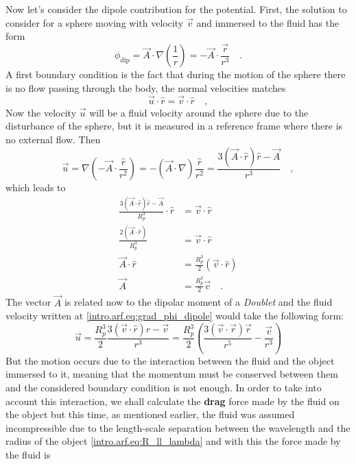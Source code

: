 Now let's consider the dipole contribution for the potential. First, the solution to consider for a sphere moving with velocity $\vec v$ and immersed to the fluid has the form
\begin{equation}\label{intro.arf.eq:dipolar_phi}
    \phi_{\text{dip}} = \vec A \cdot \nabla\left(\frac{1}{r}\right) = -\vec A\cdot\frac{\vec r}{r^3}\quad.
\end{equation}
A first boundary condition is the fact that during the motion of the sphere there is no flow passing  through the body, the normal velocities matches
\begin{equation}\label{intro.arf.eq:vn_un}
    \vec u\cdot\hat r = \vec v\cdot \hat r\quad,
\end{equation}
Now the velocity $\vec u$ will be a fluid velocity around the sphere due to the disturbance of the sphere, but it is measured in a reference frame where there is no external flow. Then
\begin{equation}\label{intro.arf.eq:grad_phi_dipole}
    \vec u = \nabla\left(-\vec A \cdot \frac{\hat r}{r^2}\right) = -(\vec A \cdot \nabla)\frac{\hat r}{r^2} = \frac{3(\vec A\cdot\hat r)\hat r - \vec A}{r^3}\quad,
\end{equation}
which leads to
\begin{align}
    \frac{3(\vec A\cdot\hat r)\hat r - \vec A}{R_p^3}\cdot\hat r &= \vec v\cdot \hat r\nonumber\\
    \frac{2(\vec A\cdot\hat r)}{R_p^3} &= \vec v\cdot\hat r\nonumber\\
    \vec A\cdot\hat r &= \frac{R_p^3}{2} (\vec v\cdot\hat r) \nonumber\\
    \vec A &= \frac{R_p^3}{2} \vec v\label{intro.arf.eq:A_dipole_v}\quad.
\end{align}
The vector $\vec A$ is related now to the dipolar moment of a \textit{Doublet} and the fluid velocity written at \eqref{intro.arf.eq:grad_phi_dipole} would take the following form:
\begin{equation}\label{intro.arf.eq:vel_dipole}
    \vec u = \frac{R_p^3}{2}\frac{3(\vec v\cdot\hat r)\hat r - \vec v}{r^3} = \frac{R_p^3}{2}\left(\frac{3(\vec v\cdot\vec r)\vec r}{r^5} - \frac{\vec v}{r^3}\right)
\end{equation}
But the motion occurs due to the interaction between the fluid and the object immersed to it, meaning that the momentum must be conserved between them and the considered boundary condition is not enough. In order to take into account this interaction, we shall calculate the \textbf{drag} force made by the fluid on the object but this time, as mentioned earlier, the fluid was assumed incompressible due to the length-scale separation between the wavelength and the radius of the object \eqref{intro.arf.eq:R_ll_lambda} and with this the force made by the fluid is 
